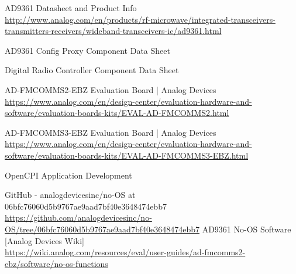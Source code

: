 \documentclass{article}
\begin{document}
\begin{thebibliography}{1}

   AD9361 Datasheet and Product Info \\
  \url{http://www.analog.com/en/products/rf-microwave/integrated-transceivers-transmitters-receivers/wideband-transceivers-ic/ad9361.html}

   AD9361 Config Proxy Component Data Sheet\\

   Digital Radio Controller Component Data Sheet \\

   AD-FMCOMMS2-EBZ Evaluation Board | Analog Devices\\
  \url{https://www.analog.com/en/design-center/evaluation-hardware-and-software/evaluation-boards-kits/EVAL-AD-FMCOMMS2.html}

   AD-FMCOMMS3-EBZ Evaluation Board | Analog Devices\\
  \url{https://www.analog.com/en/design-center/evaluation-hardware-and-software/evaluation-boards-kits/EVAL-AD-FMCOMMS3-EBZ.html}

   OpenCPI Application Development \\

   GitHub - analogdevicesinc/no-OS at 06bfc76060d5b9767ae9aad7bf40e3648474ebb7 \\
  \url{https://github.com/analogdevicesinc/no-OS/tree/06bfc76060d5b9767ae9aad7bf40e3648474ebb7}
   AD9361 No-OS Software [Analog Devices Wiki]\\
  \url{https://wiki.analog.com/resources/eval/user-guides/ad-fmcomms2-ebz/software/no-os-functions}

\end{thebibliography}
\end{document}
